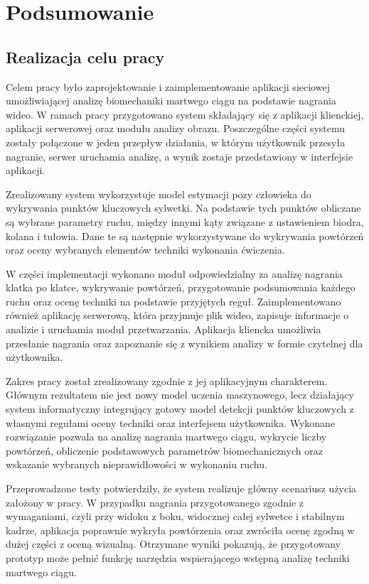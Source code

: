 \clearpage
\section*{Podsumowanie}

\subsection*{Realizacja celu pracy}

Celem pracy było zaprojektowanie i zaimplementowanie aplikacji sieciowej umożliwiającej analizę biomechaniki martwego ciągu na podstawie nagrania wideo. W ramach pracy przygotowano system składający się z aplikacji klienckiej, aplikacji serwerowej oraz modułu analizy obrazu. Poszczególne części systemu zostały połączone w jeden przepływ działania, w którym użytkownik przesyła nagranie, serwer uruchamia analizę, a wynik zostaje przedstawiony w interfejsie aplikacji.

Zrealizowany system wykorzystuje model estymacji pozy człowieka do wykrywania punktów kluczowych sylwetki. Na podstawie tych punktów obliczane są wybrane parametry ruchu, między innymi kąty związane z ustawieniem biodra, kolana i tułowia. Dane te są następnie wykorzystywane do wykrywania powtórzeń oraz oceny wybranych elementów techniki wykonania ćwiczenia.

W części implementacji wykonano moduł odpowiedzialny za analizę nagrania klatka po klatce, wykrywanie powtórzeń, przygotowanie podsumowania każdego ruchu oraz ocenę techniki na podstawie przyjętych reguł. Zaimplementowano również aplikację serwerową, która przyjmuje plik wideo, zapisuje informacje o analizie i uruchamia moduł przetwarzania. Aplikacja kliencka umożliwia przesłanie nagrania oraz zapoznanie się z wynikiem analizy w formie czytelnej dla użytkownika.

Zakres pracy został zrealizowany zgodnie z jej aplikacyjnym charakterem. Głównym rezultatem nie jest nowy model uczenia maszynowego, lecz działający system informatyczny integrujący gotowy model detekcji punktów kluczowych z własnymi regułami oceny techniki oraz interfejsem użytkownika. Wykonane rozwiązanie pozwala na analizę nagrania martwego ciągu, wykrycie liczby powtórzeń, obliczenie podstawowych parametrów biomechanicznych oraz wskazanie wybranych nieprawidłowości w wykonaniu ruchu.

Przeprowadzone testy potwierdziły, że system realizuje główny scenariusz użycia założony w pracy. W przypadku nagrania przygotowanego zgodnie z wymaganiami, czyli przy widoku z boku, widocznej całej sylwetce i stabilnym kadrze, aplikacja poprawnie wykryła powtórzenia oraz zwróciła ocenę zgodną w dużej części z oceną wizualną. Otrzymane wyniki pokazują, że przygotowany prototyp może pełnić funkcję narzędzia wspierającego wstępną analizę techniki martwego ciągu.

